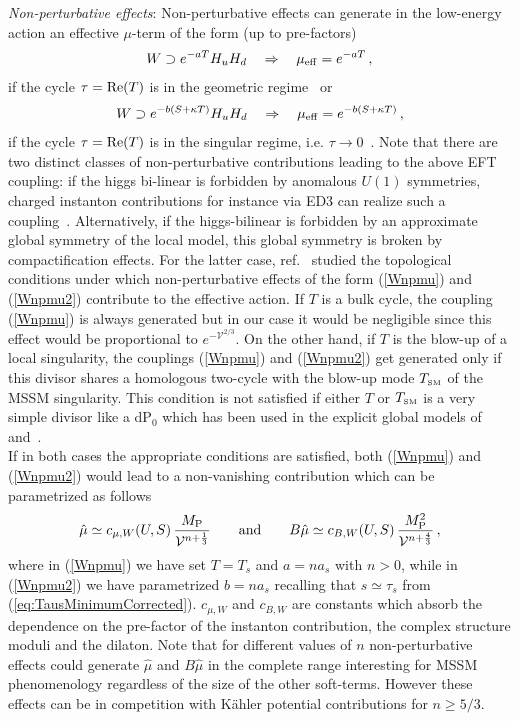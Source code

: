 \documentclass[12pt,a4paper]{book}
\def\SM{{\scriptscriptstyle \rm SM}}
\begin{document}
\medskip
\emph{Non-perturbative effects}: Non-perturbative effects can generate in the low-energy action an effective $\mu$-term of the form (up to pre-factors)
\begin{align}
W\supset e^{-a T} H_u H_d\quad\Rightarrow\quad \mu_{\rm eff} = e^{-a T}\,,
\label{Wnpmu}
\end{align}
if the cycle $\tau={\rm Re}(T)$ is in the geometric regime~\cite{Ibanez:2007tu} or
\begin{align}
W\supset e^{-b \left(S+\kappa T\right)} H_u H_d\quad\Rightarrow\quad \mu_{\rm eff} = e^{-b\left(S+\kappa T\right)}\,,
\label{Wnpmu2}
\end{align}
if the cycle $\tau={\rm Re}(T)$ is in the singular regime, i.e. $\tau\to 0$~\cite{Berenstein:2005xa}. Note that there are two distinct classes of non-perturbative contributions leading to the above EFT coupling: if the higgs bi-linear is forbidden by anomalous $U(1)$ symmetries, charged instanton contributions for instance via ED3 can realize such a coupling~\cite{Ibanez:2007tu,Berenstein:2005xa}. Alternatively, if the higgs-bilinear is forbidden by an approximate global symmetry of the local model, this global symmetry is broken by compactification effects. For the latter case, ref.~\cite{Berg:2012aq} studied the topological conditions under which non-perturbative effects of the form (\ref{Wnpmu}) and (\ref{Wnpmu2}) contribute to the effective action. If $T$ is a bulk cycle, the coupling (\ref{Wnpmu}) is always generated but in our case it would be negligible since this effect would be proportional to $e^{-\mathcal{V}^{2/3}}$. On the other hand, if $T$ is the blow-up of a local singularity, the couplings (\ref{Wnpmu}) and (\ref{Wnpmu2}) get generated only if this divisor shares a homologous two-cycle with the blow-up mode $T_\SM$ of the MSSM singularity. This condition is not satisfied if either $T$ or $T_\SM$ is a very simple divisor like a dP$_0$ which has been used in the explicit global models of~\cite{Cicoli:2012vw} and~\cite{Cicoli:2013cha}.\\

If in both cases the appropriate conditions are satisfied, both (\ref{Wnpmu}) and (\ref{Wnpmu2}) would lead to a non-vanishing contribution which can be parametrized as follows
\begin{align}
\hat{\mu} \simeq c_{\mu,W}(U,S)\, \frac{M_{\rm P}}{\mathcal{V}^{n+\frac 13}} \qquad\text{and}\qquad B \hat{\mu} \simeq c_{B,W}(U,S) \,\frac{M_{\rm P}^2}{\mathcal{V}^{n+ \frac 43}}\,,
\label{mumag}
\end{align}
where in (\ref{Wnpmu}) we have set $T=T_s$ and $a=n a_s$ with $n>0$, while in (\ref{Wnpmu2}) we have parametrized $b=n a_s$ recalling that $s\simeq \tau_s$ from (\ref{eq:TausMinimumCorrected}). $c_{\mu,W}$ and $c_{B,W}$ are constants which absorb the dependence on the pre-factor of the instanton contribution, the complex structure moduli and the dilaton. Note that for different values of $n$ non-perturbative effects could generate $\hat{\mu}$ and $B \hat{\mu}$ in the complete range interesting for MSSM phenomenology regardless of the size of the other soft-terms. However these effects can be in competition with K\"ahler potential contributions for $n \geq 5/3$.\\
\end{document}
